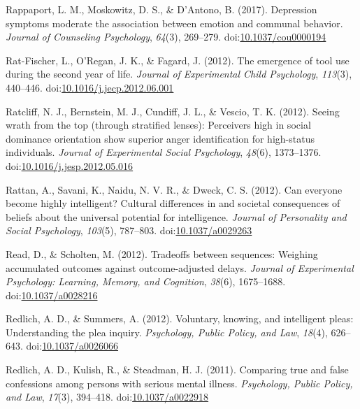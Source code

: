 \documentclass[english,man]{apa6}
\begin{document}
\hypertarget{ref-Rappaport2017}{}
Rappaport, L. M., Moskowitz, D. S., \& D'Antono, B. (2017). Depression
symptoms moderate the association between emotion and communal behavior.
\emph{Journal of Counseling Psychology}, \emph{64}(3), 269--279.
doi:\href{https://doi.org/10.1037/cou0000194}{10.1037/cou0000194}

\hypertarget{ref-Rat-Fischer2012}{}
Rat-Fischer, L., O'Regan, J. K., \& Fagard, J. (2012). The emergence of
tool use during the second year of life. \emph{Journal of Experimental
Child Psychology}, \emph{113}(3), 440--446.
doi:\href{https://doi.org/10.1016/j.jecp.2012.06.001}{10.1016/j.jecp.2012.06.001}

\hypertarget{ref-Ratcliff2012}{}
Ratcliff, N. J., Bernstein, M. J., Cundiff, J. L., \& Vescio, T. K.
(2012). Seeing wrath from the top (through stratified lenses):
Perceivers high in social dominance orientation show superior anger
identification for high-status individuals. \emph{Journal of
Experimental Social Psychology}, \emph{48}(6), 1373--1376.
doi:\href{https://doi.org/10.1016/j.jesp.2012.05.016}{10.1016/j.jesp.2012.05.016}

\hypertarget{ref-Rattan2012}{}
Rattan, A., Savani, K., Naidu, N. V. R., \& Dweck, C. S. (2012). Can
everyone become highly intelligent? Cultural differences in and societal
consequences of beliefs about the universal potential for intelligence.
\emph{Journal of Personality and Social Psychology}, \emph{103}(5),
787--803. doi:\href{https://doi.org/10.1037/a0029263}{10.1037/a0029263}

\hypertarget{ref-Read2012}{}
Read, D., \& Scholten, M. (2012). Tradeoffs between sequences: Weighing
accumulated outcomes against outcome-adjusted delays. \emph{Journal of
Experimental Psychology: Learning, Memory, and Cognition}, \emph{38}(6),
1675--1688.
doi:\href{https://doi.org/10.1037/a0028216}{10.1037/a0028216}

\hypertarget{ref-Redlich2012}{}
Redlich, A. D., \& Summers, A. (2012). Voluntary, knowing, and
intelligent pleas: Understanding the plea inquiry. \emph{Psychology,
Public Policy, and Law}, \emph{18}(4), 626--643.
doi:\href{https://doi.org/10.1037/a0026066}{10.1037/a0026066}

\hypertarget{ref-Redlich2011}{}
Redlich, A. D., Kulish, R., \& Steadman, H. J. (2011). Comparing true
and false confessions among persons with serious mental illness.
\emph{Psychology, Public Policy, and Law}, \emph{17}(3), 394--418.
doi:\href{https://doi.org/10.1037/a0022918}{10.1037/a0022918}
\end{document}
